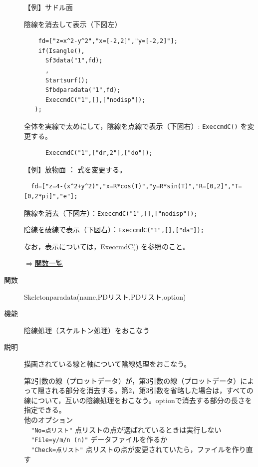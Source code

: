 \documentclass[papersize,a4paper,12pt,uplatex]{jsarticle}
\begin{document}
\begin{description}
\vspace{\baselineskip}
【例】サドル面

陰線を消去して表示（下図左）
\begin{verbatim}
    fd=["z=x^2-y^2","x=[-2,2]","y=[-2,2]"];
    if(Isangle(),
      Sf3data("1",fd);
      ,
      Startsurf();
      Sfbdparadata("1",fd);
      ExeccmdC("1",[],["nodisp"]);
   );
\end{verbatim}
全体を実線で太めにして，陰線を点線で表示（下図右）: \verb|ExeccmdC()| を変更する。
\begin{verbatim}
      ExeccmdC("1",["dr,2"],["do"]);
\end{verbatim}
      \begin{center}     \end{center}

【例】放物面  ： 式を変更する。
\begin{verbatim}
  fd=["z=4-(x^2+y^2)","x=R*cos(T)","y=R*sin(T)","R=[0,2]","T=[0,2*pi]","e"];
\end{verbatim}

 陰線を消去（下図左）：\verb|ExeccmdC("1",[],["nodisp"]);|
 
 陰線を破線で表示（下図右）：\verb|ExeccmdC("1",[],["da"]);|
      \begin{center}    \end{center}

なお，表示については，\hyperlink{execcmdc}{ExeccmdC()} を参照のこと。

\begin{flushright} \hyperlink{functionlist}{$\Rightarrow$関数一覧}\end{flushright}

\hypertarget{skeletonparadata}{}
\item[関数]  Skeletonparadata(name,PDリスト,PDリスト,option)
\item[機能]  陰線処理（スケルトン処理）をおこなう
\item[説明]  描画されている線と軸について陰線処理をおこなう。

第2引数の線（プロットデータ）が，第3引数の線（プロットデータ）によって隠される部分を消去する。第2，第3引数を省略した場合は，すべての線について，互いの陰線処理をおこなう。optionで消去する部分の長さを指定できる。\\
他のオプション\\
　\verb|"No=点リスト"| 点リストの点が選ばれているときは実行しない\\
　\verb|"File=y/m/n (n)"| データファイルを作るか\\
　\verb|"Check=点リスト"| 点リストの点が変更されていたら，ファイルを作り直す



\end{description}
\end{document}
